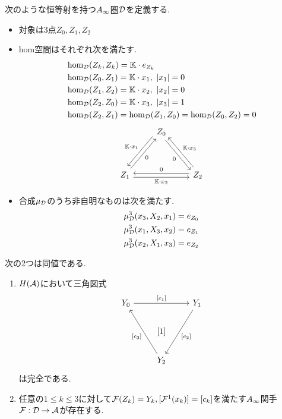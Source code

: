 \documentclass[uplatex, a4paper, 14Q, dvipdfmx]{jsarticle}
\begin{document}
\begin{definition}
  次のような恒等射を持つ$A_{\infty}$圏$\mathcal{D}$を定義する.
  \begin{itemize}
    \item 対象は$3$点$Z_0,Z_1,Z_2$
    \item hom空間はそれぞれ次を満たす. 
    \begin{align*}
      &\hom_{\mathcal{D}}(Z_k,Z_k) = \mathbb{K} \cdot e_{Z_k} \\
      &\hom_{\mathcal{D}}(Z_0,Z_1) = \mathbb{K} \cdot x_1, ~ |x_1| = 0 \\
      &\hom_{\mathcal{D}}(Z_1,Z_2) = \mathbb{K} \cdot x_2, ~ |x_2| = 0 \\
      &\hom_{\mathcal{D}}(Z_2,Z_0) = \mathbb{K} \cdot x_3, ~ |x_3| = 1 \\
      &\hom_{\mathcal{D}}(Z_2,Z_1) = \hom_{\mathcal{D}}(Z_1,Z_0) = \hom_{\mathcal{D}}(Z_0,Z_2)  = 0 
    \end{align*}
    \[\begin{tikzcd}
      & {Z_0} \\
      \\
      {Z_1} && {Z_2}
      \arrow["{\bbK \cdot x_1}"', shift right=2, from=1-2, to=3-1]
      \arrow["{\bbK \cdot x_3}"', shift right=1, from=3-3, to=1-2]
      \arrow["{\bbK \cdot x_2}"', shift right=1, from=3-1, to=3-3]
      \arrow["0"', from=3-1, to=1-2]
      \arrow["0"', shift right=1, from=3-3, to=3-1]
      \arrow["0"', shift right=1, from=1-2, to=3-3]
    \end{tikzcd}\]
    \item 合成$\mu_{\mathcal{D}}$のうち非自明なものは次を満たす.
    \begin{align*}
      &\mu^3_{\mathcal{D}}(x_3,X_2,x_1) = e_{Z_0} \\
      &\mu^3_{\mathcal{D}}(x_1,X_3,x_2) = e_{Z_1} \\
      &\mu^3_{\mathcal{D}}(x_2,X_1,x_3) = e_{Z_2}
    \end{align*}
  \end{itemize} 
\end{definition}

\begin{theorem} \label{prop_exact_is_equivalent_to_Ainf_functor_D_to_A}
  次の2つは同値である. 
  \begin{enumerate}
    \item $H(\mathcal{A})$において三角図式
    \[\begin{tikzcd}
      {Y_0} && {Y_1} \\
      & {[1]} \\
      & {Y_2}
      \arrow["{[c_1]}", from=1-1, to=1-3]
      \arrow["{[c_2]}", from=1-3, to=3-2]
      \arrow["{[c_3] }", from=3-2, to=1-1]
    \end{tikzcd}\]
    は完全である.
    \item 任意の$1 \leq k \leq 3$に対して$\mathcal{F}(Z_k) = Y_k, [\mathcal{F}^1(x_k)] = [c_k]$を満たす$A_{\infty}$関手$\mathcal{F} : \mathcal{D} \to \mathcal{A}$が存在する.
  \end{enumerate}
\end{theorem}
\end{document}
